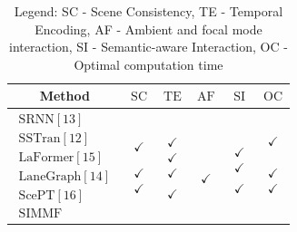 \documentclass[letterpaper, 10 pt, conference]{ieeeconf}  %
\begin{document}
\begin{table}[htbp]
\begin{center}
\begin{tabular}{cccccc}
\toprule Method & $\mathrm{SC}$ & $\mathrm{TE}$ & $\mathrm{AF}$ & $\mathrm{SI}$ & $\mathrm{OC}$  \\
\midrule $\begin{array}{l}\text {SRNN}[13]
\\
\text {SSTran}[12] \\
\text {LaFormer}[15]\\
\text {LaneGraph}[14] \\
\text {ScePT}[16] \\
\text{SIMMF}\end{array}$ & $\begin{array}{l}\\
\checkmark \\
\\
\\
\checkmark \\
\checkmark
\end{array}$ & 
$\begin{array}{l}
     \\ 
    \checkmark \\
    \checkmark \\
    \checkmark \\
    \\
    \checkmark
     
\end{array}$
& $\begin{array}{l}
\\
 \\
 \\
\\
\\
\checkmark
\end{array} $
& $\begin{array}{cc}
   \\
   \\
   \checkmark\\
  \checkmark \\
   \\
   \checkmark
\end{array}$
& $\begin{array}{l}
\checkmark \\ \\
\\
\\
\checkmark
\\
\checkmark\end{array}$\\
\bottomrule

\end{tabular}
\end{center}\vspace{-0.15in}
\caption{Legend: SC - Scene Consistency, TE - Temporal Encoding, AF - Ambient and focal mode interaction, SI - Semantic-aware Interaction, OC - Optimal computation time}\label{checkmark_tab}
\end{table}\vspace{-20pt}
\end{document}
